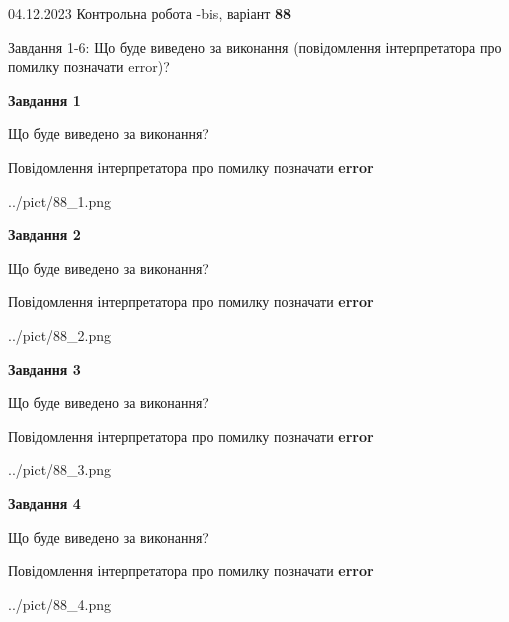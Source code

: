 \documentclass[12pt, ukrainian]{article}
\begin{document}
{{04.12.2023 Контрольна робота -bis, варіант  \No \textbf { 88 }\par}}
{

Завдання 1-6: Що буде виведено за виконання (повідомлення інтерпретатора про помилку позначати error)?


{\begin {center}\textbf{Завдання 1}\end {center}}\par
Що буде виведено за виконання? \par
Повідомлення інтерпретатора про помилку позначати \textbf{error}

\begin{center}
	{../pict/88_1.png}
\end{center}
\newpage

{\begin {center}\textbf{Завдання 2}\end {center}}\par
Що буде виведено за виконання? \par
Повідомлення інтерпретатора про помилку позначати \textbf{error}

\begin{center}
	{../pict/88_2.png}
\end{center}
\newpage

{\begin {center}\textbf{Завдання 3}\end {center}}\par
Що буде виведено за виконання? \par
Повідомлення інтерпретатора про помилку позначати \textbf{error}

\begin{center}
	{../pict/88_3.png}
\end{center}
\newpage

{\begin {center}\textbf{Завдання 4}\end {center}}\par
Що буде виведено за виконання? \par
Повідомлення інтерпретатора про помилку позначати \textbf{error}

\begin{center}
	{../pict/88_4.png}
\end{center}
\newpage

}
\end{document}
